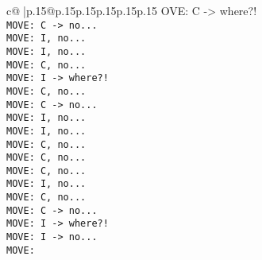 \documentclass{article}
\begin{document}
{\begin{supertabular}{c@{$\;$}|p{.15\linewidth}@{}p{.15\linewidth}p{.15\linewidth}p{.15\linewidth}p{.15\linewidth}p{.15\linewidth}}
{{{OVE: C -> where?!\\ \tt  MOVE: C -> no...\\ \tt  MOVE: I, no...\\ \tt  MOVE: I, no...\\ \tt  MOVE: C, no...\\ \tt  MOVE: I -> where?!\\ \tt  MOVE: C, no...\\ \tt  MOVE: C -> no...\\ \tt  MOVE: I, no...\\ \tt  MOVE: I, no...\\ \tt  MOVE: C, no...\\ \tt  MOVE: C, no...\\ \tt  MOVE: C, no...\\ \tt  MOVE: I, no...\\ \tt  MOVE: C, no...\\ \tt  MOVE: C -> no...\\ \tt  MOVE: I -> where?!\\ \tt  MOVE: I -> no...\\ \tt  MOVE: }}}
\end{supertabular}}
\end{document}
